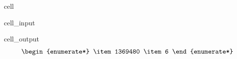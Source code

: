 \documentclass[letterpaper,10pt,english]{jupyterBook}
\begin{document}
\begin{sphinxuseclass}{cell}\begin{sphinxVerbatimInput}

\begin{sphinxuseclass}{cell_input}
\begin{sphinxVerbatim}[commandchars=\\\{\}]
\end{sphinxVerbatim}

\end{sphinxuseclass}\end{sphinxVerbatimInput}
\begin{sphinxVerbatimOutput}

\begin{sphinxuseclass}{cell_output}\begin{equation*}
\begin{split}\begin{enumerate*}
\item 1369480
\item 6
\end{enumerate*}\end{split}
\end{equation*}
\end{sphinxuseclass}\end{sphinxVerbatimOutput}

\end{sphinxuseclass}
\end{document}

